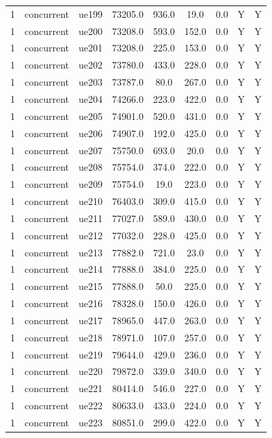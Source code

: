 \begin{table}[ht]
\begin{tabular}{|c|c|c|c|c|c|c|c|c|}
1 & concurrent & ue199 & 73205.0 & 936.0 & 19.0 & 0.0 & Y & Y \\
1 & concurrent & ue200 & 73208.0 & 593.0 & 152.0 & 0.0 & Y & Y \\
1 & concurrent & ue201 & 73208.0 & 225.0 & 153.0 & 0.0 & Y & Y \\
1 & concurrent & ue202 & 73780.0 & 433.0 & 228.0 & 0.0 & Y & Y \\
1 & concurrent & ue203 & 73787.0 & 80.0 & 267.0 & 0.0 & Y & Y \\
1 & concurrent & ue204 & 74266.0 & 223.0 & 422.0 & 0.0 & Y & Y \\
1 & concurrent & ue205 & 74901.0 & 520.0 & 431.0 & 0.0 & Y & Y \\
1 & concurrent & ue206 & 74907.0 & 192.0 & 425.0 & 0.0 & Y & Y \\
1 & concurrent & ue207 & 75750.0 & 693.0 & 20.0 & 0.0 & Y & Y \\
1 & concurrent & ue208 & 75754.0 & 374.0 & 222.0 & 0.0 & Y & Y \\
1 & concurrent & ue209 & 75754.0 & 19.0 & 223.0 & 0.0 & Y & Y \\
1 & concurrent & ue210 & 76403.0 & 309.0 & 415.0 & 0.0 & Y & Y \\
1 & concurrent & ue211 & 77027.0 & 589.0 & 430.0 & 0.0 & Y & Y \\
1 & concurrent & ue212 & 77032.0 & 228.0 & 425.0 & 0.0 & Y & Y \\
1 & concurrent & ue213 & 77882.0 & 721.0 & 23.0 & 0.0 & Y & Y \\
1 & concurrent & ue214 & 77888.0 & 384.0 & 225.0 & 0.0 & Y & Y \\
1 & concurrent & ue215 & 77888.0 & 50.0 & 225.0 & 0.0 & Y & Y \\
1 & concurrent & ue216 & 78328.0 & 150.0 & 426.0 & 0.0 & Y & Y \\
1 & concurrent & ue217 & 78965.0 & 447.0 & 263.0 & 0.0 & Y & Y \\
1 & concurrent & ue218 & 78971.0 & 107.0 & 257.0 & 0.0 & Y & Y \\
1 & concurrent & ue219 & 79644.0 & 429.0 & 236.0 & 0.0 & Y & Y \\
1 & concurrent & ue220 & 79872.0 & 339.0 & 340.0 & 0.0 & Y & Y \\
1 & concurrent & ue221 & 80414.0 & 546.0 & 227.0 & 0.0 & Y & Y \\
1 & concurrent & ue222 & 80633.0 & 433.0 & 224.0 & 0.0 & Y & Y \\
1 & concurrent & ue223 & 80851.0 & 299.0 & 422.0 & 0.0 & Y & Y \\

\end{tabular}
\end{table}
